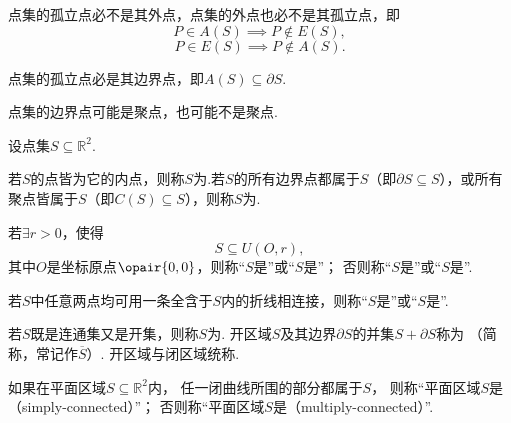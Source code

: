 \begin{property}
点集的孤立点必不是其外点，点集的外点也必不是其孤立点，即\[
P \in A(S) \implies P \notin E(S),
\]\[
P \in E(S) \implies P \notin A(S).
\]
\end{property}

\begin{property}
点集的孤立点必是其边界点，即\(A(S) \subseteq \partial{S}\).
\end{property}

\begin{property}
点集的边界点可能是聚点，也可能不是聚点.
\end{property}

\begin{definition}
设点集\(S \subseteq \mathbb{R}^2\).

若\(S\)的点皆为它的内点，则称\(S\)为.若\(S\)的所有边界点都属于\(S\)（即\(\partial S \subseteq S\)），或所有聚点皆属于\(S\)（即\(C(S) \subseteq S\)），则称\(S\)为.

若\(\exists r > 0\)，使得\[
S \subseteq U(O,r),
\]其中\(O\)是坐标原点\(\opair{0,0}\)，则称“\(S\)是”或“\(S\)是”；
否则称“\(S\)是”或“\(S\)是”.

若\(S\)中任意两点均可用一条全含于\(S\)内的折线相连接，则称“\(S\)是”或“\(S\)是”.

若\(S\)既是连通集又是开集，则称\(S\)为.
开区域\(S\)及其边界\(\partial S\)的并集\(S + \partial S\)称为%
（简称，常记作\(\overline{S}\)）.
开区域与闭区域统称.
\end{definition}

\begin{definition}\label{definition:集合论.平面区域的连通性}
如果在平面区域\(S \subseteq \mathbb{R}^2\)内，%
任一闭曲线所围的部分都属于\(S\)，%
则称“平面区域\(S\)是（simply-connected）”；
否则称“平面区域\(S\)是（multiply-connected）”.
\end{definition}

